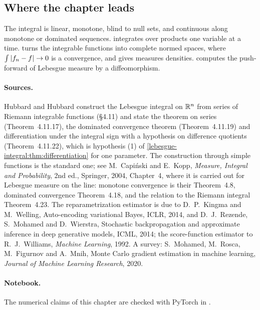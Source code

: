 \begin{notechapter}
\section{Where the chapter leads}\label{lebesgue-integral:sec:outlook}

The integral is linear, monotone, blind to null sets, and continuous
along monotone or dominated sequences.  integrates over
products one variable at a time.  turns the
integrable functions into complete normed spaces, where
$\int\left|f_n - f\right|\to0$ is a convergence, and gives measures densities.
 computes the push-forward of Lebesgue
measure by a diffeomorphism.

\paragraph{Sources.} Hubbard and Hubbard construct the Lebesgue integral
on $\mathbb{R}^n$ from series of Riemann integrable functions (\S4.11) and state
the theorem on series (Theorem~4.11.17), the dominated convergence
theorem (Theorem~4.11.19) and differentiation under the integral sign
with a hypothesis on difference quotients (Theorem~4.11.22), which is
hypothesis (1) of \cref{lebesgue-integral:thm:differentiation} for one
parameter. The construction through simple functions is the standard
one; see M.~Capi\'nski and E.~Kopp, \emph{Measure, Integral and
Probability}, 2nd ed., Springer, 2004, Chapter~4, where it is carried
out for Lebesgue measure on the line: monotone convergence is their
Theorem~4.8, dominated convergence Theorem~4.18, and the relation to
the Riemann integral Theorem~4.23. The reparametrization estimator is
due to
D.~P.~Kingma and M.~Welling, Auto-encoding variational Bayes, ICLR,
2014, and D.~J.~Rezende, S.~Mohamed and D.~Wierstra, Stochastic
backpropagation and approximate inference in deep generative models,
ICML, 2014; the
score-function estimator to R.~J.~Williams, \emph{Machine Learning},
1992. A survey: S.~Mohamed, M.~Rosca, M.~Figurnov and A.~Mnih, Monte
Carlo gradient estimation in machine learning, \emph{Journal of Machine
Learning Research}, 2020.

\paragraph{Notebook.} The numerical claims of this chapter are checked
with PyTorch in .


\end{notechapter}
